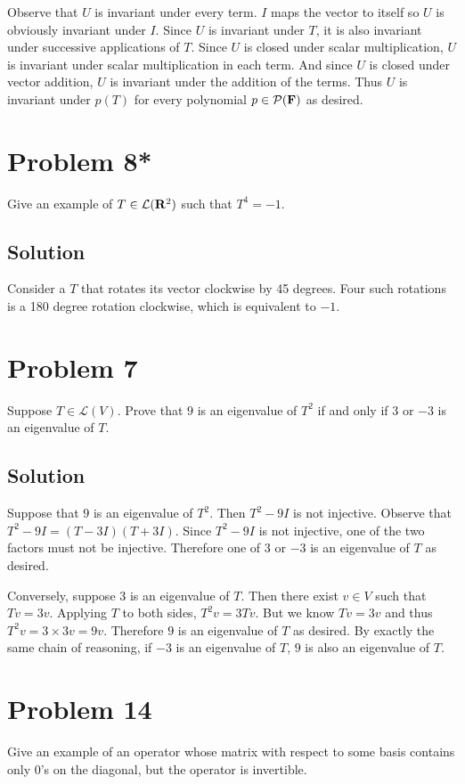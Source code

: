 \documentclass{article}
\begin{document}
Observe that $U$ is invariant under every term. $I$ maps the vector to itself so $U$ is obviously invariant under $I$. Since $U$ is invariant under $T$, it is also invariant under successive applications of $T$. Since $U$ is closed under scalar multiplication, $U$ is invariant under scalar multiplication in each term. And since $U$ is closed under vector addition, $U$ is invariant under the addition of the terms. Thus $U$ is invariant under $p(T)$ for every polynomial $p\in\mathcal{P}(\mathbf{F})$ as desired.

\section*{Problem 8*}
Give an example of $T\in\mathcal{L}(\mathbf{R}^2)$ such that $T^4=-1$.

\subsection*{Solution}
Consider a $T$ that rotates its vector clockwise by 45 degrees. Four such rotations is a 180 degree rotation clockwise, which is equivalent to $-1$.

\section*{Problem 7}
Suppose $T\in\mathcal{L}(V)$. Prove that $9$ is an eigenvalue of $T^2$ if and only if $3$ or $-3$ is an eigenvalue of $T$.

\subsection*{Solution}
Suppose that $9$ is an eigenvalue of $T^2$. Then $T^2-9I$ is not injective. Observe that $T^2-9I=(T-3I)(T+3I)$. Since $T^2-9I$ is not injective, one of the two factors must not be injective. Therefore one of $3$ or $-3$ is an eigenvalue of $T$ as desired.

\vs

Conversely, suppose $3$ is an eigenvalue of $T$. Then there exist $v\in V$ such that $Tv=3v$. Applying $T$ to both sides, $T^2v=3Tv$. But we know $Tv=3v$ and thus $T^2v=3\times3v=9v$. Therefore $9$ is an eigenvalue of $T$ as desired. By exactly the same chain of reasoning, if $-3$ is an eigenvalue of $T$, $9$ is also an eigenvalue of $T$.

\section*{Problem 14}
Give an example of an operator whose matrix with respect to some basis contains only 0's on the diagonal, but the operator is invertible.
\end{document}
